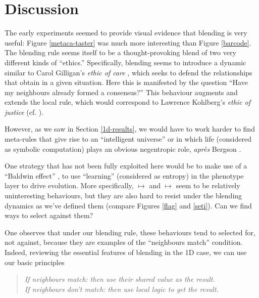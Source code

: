 \documentclass{AISB2008}
\makeatletter
\renewcommand{\boxed}[1]{\text{\fboxsep=.2em\fbox{\m@th$\displaystyle#1$}}}
\newcommand{\mystrut}{\vphantom{b\gamma}}
\makeatother
\begin{document}
\newpage

\section{Discussion}

The early experiments seemed to provide visual evidence that blending
is very useful: Figure \ref{metaca-taster} was much more interesting
than Figure \ref{barcode}.  The blending rule seems itself to be a
thought-provoking blend of two very different kinds of ``ethics.''
Specifically, blending seems to introduce a dynamic similar to Carol
Gilligan's \emph{ethic of care} \cite{gilligan1982different}, which
seeks to defend the relationships that obtain in a given situation.
Here this is manifested by the question ``Have my neighbours already
formed a consensus?''  This behaviour augments and extends the local
rule, which would correspond to Lawrence Kohlberg’s \emph{ethic of
  justice} (cf. \cite{benhabib1985generalized}).

However, as we saw in Section \ref{1d-results}, we would have to work
harder to find meta-rules that give rise to an ``intelligent
universe'' or in which life (considered as symbolic computation) plays
an obvious negentropic role, \emph{apr\`es} Bergson
\cite{bergson1912creative}.

One strategy that has not been fully exploited here would be to make
use of a ``Baldwin effect''
\cite{baldwin-effect,deacon2003hierarchic}, to use ``learning''
(considered as entropy) in the phenotype layer to drive evolution.
More specifically, \boxed{0\mystrut}\boxed{0\mystrut}\boxed{0\mystrut}
$\mapsto$ \boxed{0\mystrut} and
\boxed{1\mystrut}\boxed{1\mystrut}\boxed{1\mystrut} $\mapsto$
\boxed{1\mystrut} seem to be relatively uninteresting behaviours, but
they are also hard to resist under the blending dynamics as we've
defined them (compare Figures \ref{flag} and \ref{seti}).  Can we find
ways to select against them?

One observes that under our blending rule, these behaviours tend to
selected for, not against, because they are examples of the
``neighbours match'' condition.  Indeed, reviewing the essential
features of blending in the 1D case, we can use our basic principles

\begin{quote}
 \emph{If neighbours match:} \emph{then use their shared value as the result.}\\
 \emph{If neighbours don't match:} \emph{then use local logic to get the result.}
\end{quote}
\end{document}
